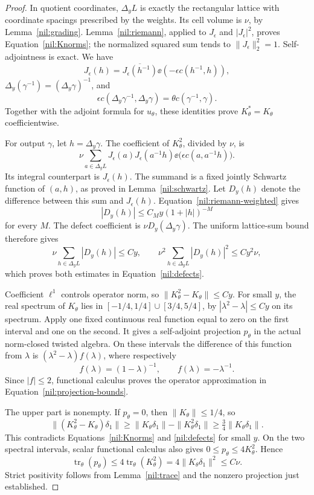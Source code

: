 \begin{proof}
In quotient coordinates, \(\Delta_y L\) is exactly the
rectangular lattice with coordinate spacings prescribed by the
weights. Its cell volume is \(\nu\), by Lemma~\ref{nil:grading}.
Lemma~\ref{nil:riemann}, applied to \(J_\epsilon\) and
\(|J_\epsilon|^2\), proves Equation~\ref{nil:Knorms}; the
normalized squared sum tends to \(\|J_\epsilon\|_2^2=1\).
Self-adjointness is exact. We have
\[
 J_\epsilon(h)=\overline{J_\epsilon(h^{-1})}
                         \ee(-\epsilon c(h^{-1},h)),
\]
\(\Delta_y(\gamma^{-1})=(\Delta_y\gamma)^{-1}\), and
\[
 \epsilon c(\Delta_y\gamma^{-1},\Delta_y\gamma)
                         =\theta c(\gamma^{-1},\gamma).
\]
Together with the adjoint formula for \(u_\theta\), these
identities prove \(K_\theta^*=K_\theta\) coefficientwise.

For output \(\gamma\), let \(h=\Delta_y\gamma\).
The coefficient of \(K_\theta^2\), divided by \(\nu\), is
\[
 \nu\sum_{a\in\Delta_yL}
   J_\epsilon(a)J_\epsilon(a^{-1}h)
       \ee\bigl(\epsilon c(a,a^{-1}h)\bigr).
\]
Its integral counterpart is \(J_\epsilon(h)\).
The summand is a fixed jointly Schwartz function of \((a,h)\),
as proved in Lemma~\ref{nil:schwartz}. Let \(D_y(h)\) denote
the difference between this sum and \(J_\epsilon(h)\).
Equation~\ref{nil:riemann-weighted} gives
\[
 |D_y(h)|\le C_M y(1+|h|)^{-M}
\]
for every \(M\). The defect coefficient is
\(\nu D_y(\Delta_y\gamma)\). The uniform lattice-sum bound
therefore gives
\[
 \nu\sum_{h\in\Delta_yL}|D_y(h)|\le Cy,\qquad
 \nu^2\sum_{h\in\Delta_yL}|D_y(h)|^2\le Cy^2\nu,
\]
which proves both estimates in Equation~\ref{nil:defects}.

Coefficient \(\ell^1\) controls operator norm, so
\(\|K_\theta^2-K_\theta\|\le Cy\).
For small \(y\), the real spectrum of \(K_\theta\) lies in
\([-1/4,1/4]\cup[3/4,5/4]\), by
\(|\lambda^2-\lambda|\le Cy\) on its spectrum.
Apply one fixed continuous real function equal to zero on
the first interval and one on the second. It gives a
self-adjoint projection \(p_\theta\) in the actual norm-closed
twisted algebra. On these intervals the difference of this
function from \(\lambda\) is \((\lambda^2-\lambda)f(\lambda)\),
where respectively
\[
 f(\lambda)=(1-\lambda)^{-1},\qquad f(\lambda)=-\lambda^{-1}.
\]
Since \(|f|\le2\), functional calculus proves the operator
approximation in Equation~\ref{nil:projection-bounds}.

The upper part is nonempty. If \(p_\theta=0\), then
\(\|K_\theta\|\le1/4\), so
\[
 \|(K_\theta^2-K_\theta)\delta_1\|
 \ge \|K_\theta\delta_1\|-\|K_\theta^2\delta_1\|
 \ge\tfrac34\|K_\theta\delta_1\|.
\]
This contradicts Equations~\ref{nil:Knorms} and
\ref{nil:defects} for small \(y\).
On the two spectral intervals, scalar functional calculus
also gives \(0\le p_\theta\le4K_\theta^2\). Hence
\[
 \operatorname{tr}_\theta(p_\theta)
 \le4\operatorname{tr}_\theta(K_\theta^2)
 =4\|K_\theta\delta_1\|^2\le C\nu.
\]
Strict positivity follows from Lemma~\ref{nil:trace} and the
nonzero projection just established.


\end{proof}
